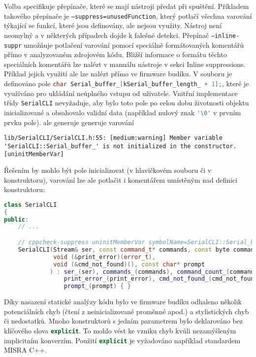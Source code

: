 Volba  specifikuje přepínače, které se mají nástroji
 předat při spuštění. Příkladem takového přepínače je
\texttt{--suppress=unusedFunction}, který potlačí všechna varování týkající se
funkcí, které jsou definovány, ale nejsou využity.
Nástroj není neomylný a v některých případech dojde k falešné detekci. Přepínač
\texttt{--inline-suppr} umožňuje potlačení varování pomocí speciálně
formátovaných komentářů přímo v analyzovaném zdrojovém kódu. Bližší informace
o formátu těchto speciálních komentářů lze nalézt v manuálu nástroje
 v sekci Inline suppressions.~\cite{cppcheckmanual}
Příklad jejich využití ale lze nalézt přímo ve firmware budíku.
V souboru  je definováno pole
\lstinline[language=C]!char Serial_buffer_[kSerial_buffer_length_ + 1];!,
které je využíváno pro ukládání neúplného vstupu od uživatele. Vnitřní
implementace třídy \texttt{SerialCLI} nevyžaduje, aby bylo toto pole po celou
dobu životnosti objektu inicializované a obsahovalo validní data (například
nulový znak \lstinline[language=C]!'\0'! v prvním prvku pole).
 ale generuje generuje varování
\begin{lstlisting}[style=terminal,breakatwhitespace=true]
lib/SerialCLI/SerialCLI.h:55: [medium:warning] Member variable 'SerialCLI::Serial_buffer_' is not initialized in the constructor. [uninitMemberVar]
\end{lstlisting}
Řešením by mohlo být pole inicializovat (v hlavičkovém souboru či v
konstruktoru), varování lze ale potlačit i komentářem umístěným nad definici
konstruktoru:
\begin{lstlisting}[language=C++]
class SerialCLI
{
public:
    // ...

    // cppcheck-suppress uninitMemberVar symbolName=SerialCLI::Serial_buffer_
    SerialCLI(Stream& ser, const command_t* commands, const byte command_count,
              void (&print_error)(error_t),
              void (&cmd_not_found)(), const char* prompt
             ) : ser_(ser), commands_(commands), command_count_(command_count),
                 print_error_(print_error), cmd_not_found_(cmd_not_found),
                 prompt_(prompt) { }
\end{lstlisting}


Díky nasazení statické analýzy kódu bylo ve firmware budíku odhaleno několik
potenciálních chyb (čtení z neinicializované proměnné apod.) a stylistických
chyb či nedostatků. Mnoho konstruktorů s jedním parametrem bylo deklarováno bez
klíčového slova \lstinline[language=C++]!explicit!. To mohlo vést ke vzniku
chyb kvůli nezamýšleným implicitním konverzím. Použití
\lstinline[language=C++]!explicit! je vyžadováno například standardem
MISRA C++.

